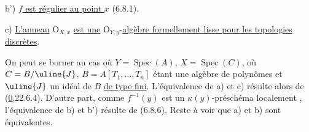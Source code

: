 b') \uline{$f$ est régulier au point $x$} (6.8.1).

c) \uline{L'anneau} $\mathrm O_{X,x}$ \uline{est une} $\mathrm O_{Y,y}$-\uline{algèbre formellement lisse pour les topologies discrètes}.

On peut se borner au cas où $Y=\operatorname{Spec}(A)$,  $X=\operatorname{Spec}(C)$, où $C=B/\uline{J}$, $B=A[T_1,\ldots,T_n]$ étant une algèbre de polynômes et $\uline{J}$ un idéal de $B$ \uline{de type fini}. L'équivalence de a) et c) résulte alors de (\uline{0},22.6.4). D'autre part, comme $f^{-1}(y)$ est un $\kappa(y)$-préschéma localement  , l'équivalence de b) et b') résulte de (6.8.6). Reste à voir que a) et b) sont équivalentes.

